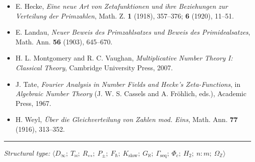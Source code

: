 \documentclass[12pt,a4paper]{article}
\begin{document}
\begin{itemize}
    \item E. Hecke, \emph{Eine neue Art von Zetafunktionen und ihre Beziehungen zur Verteilung der Primzahlen}, Math. Z. \textbf{1} (1918), 357--376; \textbf{6} (1920), 11--51.
    \item E. Landau, \emph{Neuer Beweis des Primzahlsatzes und Beweis des Primidealsatzes}, Math. Ann. \textbf{56} (1903), 645--670.
    \item H. L. Montgomery and R. C. Vaughan, \emph{Multiplicative Number Theory I: Classical Theory}, Cambridge University Press, 2007.
    \item J. Tate, \emph{Fourier Analysis in Number Fields and Hecke's Zeta-Functions}, in \emph{Algebraic Number Theory} (J. W. S. Cassels and A. Fröhlich, eds.), Academic Press, 1967.
    \item H. Weyl, \emph{Über die Gleichverteilung von Zahlen mod. Eins}, Math. Ann. \textbf{77} (1916), 313--352.
\end{itemize}

\begin{center}
\rule{0.5\textwidth}{0.4pt}
\end{center}

\emph{Structural type:} $\langle D_{\infty};\ T_{\bowtie};\ R_{\leftrightarrow};\ P_{\pm};\ F_{\hbar};\ K_\text{slow};\ G_{\aleph};\ \Gamma_\text{seq};\ \Phi_c;\ H_2;\ n{:}m;\ \Omega_\mathbb{Z} \rangle$
\end{document}
